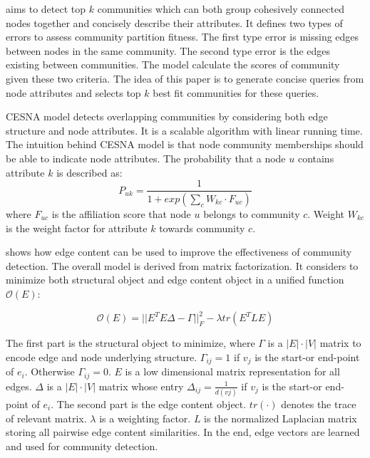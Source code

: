 \cite{pool2014description} aims to detect top $k$ communities which can both group cohesively connected nodes together and concisely describe their attributes. It defines two types of errors to assess community partition fitness. The first type error is missing edges between nodes in the same community. The second type error is the edges existing between communities. The model calculate the scores of community given these two criteria. The idea of this paper is to generate concise queries from node attributes and selects top $k$ best fit communities for these queries. 

CESNA model \cite{yang2013community} detects overlapping communities by considering both edge structure and node attributes. It is a scalable algorithm with linear running time. The intuition behind CESNA model is that node community memberships should be able to indicate node attributes. The probability that a node $u$ contains attribute $k$ is described as:
\begin{equation}
	P_{uk} = \frac{1}{1+exp(\sum_c W_{kc}\cdot F_{uc})}
\end{equation}
where $F_{uc}$ is the affiliation score that node $u$ belongs to community $c$. Weight $W_{kc}$ is the weight factor for attribute $k$ towards community $c$.

\cite{qi2012community} shows how edge content can be used to improve the effectiveness of community detection. The overall model is derived from matrix factorization. It considers to minimize both structural object and edge content object in a unified function $\mathcal{O}(E)$:

\begin{equation}
\mathcal{O}(E) = ||E^TE\Delta - \Gamma||^2_F - \lambda tr(E^TLE)
\end{equation}

The first part is the structural object to minimize, where $\Gamma$ is a $|E|\cdot|V|$  matrix to encode edge and node underlying structure. $\Gamma_{ij} = 1$ if $v_j$ is the start-or end-point of $e_i$. Otherwise $\Gamma_{ij} = 0$. $E$ is a low dimensional matrix representation for all edges. $\Delta$ is a  $|E|\cdot|V|$  matrix whose entry $\Delta_{ij} = \frac{1}{d(vj)}$ if $v_j$ is the start-or end-point of $e_i$. The second part is the edge content object. $tr(\cdot)$ denotes the trace of relevant matrix. $\lambda$ is a weighting factor. $L$ is the normalized Laplacian matrix storing all pairwise edge content similarities. In the end, edge vectors are learned  and used for community detection.

